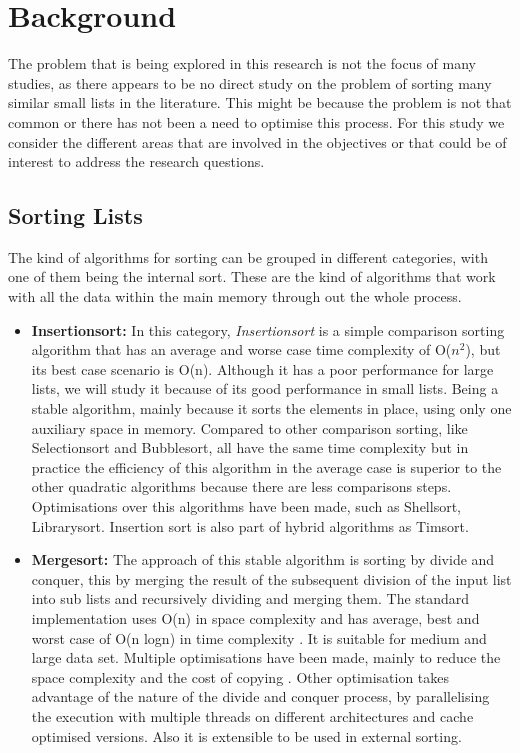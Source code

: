 \documentclass[a4paper,12pt]{article}
\begin{document}
\section{Background}

The problem that is being explored in this research is not the focus of many studies, as there appears to be no direct study on the problem of sorting many similar small lists in the literature. This might be because the problem is not that common or there has not been a need to optimise this process. For this study we consider the different areas that are involved in the objectives or that could be of interest to address the research questions.

\subsection {Sorting Lists}
The kind of algorithms for sorting can be grouped in different categories, with one of them being the internal sort. These are the kind of algorithms that work with all the data within the main memory through out the whole process.
\begin{itemize}
\item {\bf Insertionsort:}  In this category, {\it Insertionsort} is a simple comparison sorting algorithm that has an average and worse case time complexity of O(${n}^2$), but its best case scenario is O(n). Although it has a poor performance for large lists, we will study it because of its good performance in small lists. Being a stable algorithm, mainly because it sorts the elements in place, using only one auxiliary space in memory\cite{knuth1997artInsert}. Compared to other comparison sorting, like Selectionsort and Bubblesort, all have the same time complexity but in practice the efficiency of this algorithm in the average case is superior to the other quadratic algorithms because there are less comparisons steps. Optimisations over this algorithms have been made, such as Shellsort\cite{knuth1997artShell}, Librarysort\cite{bender2006insertion}. Insertion sort is also part of hybrid algorithms as Timsort\cite{Timsort}.

\item {\bf Mergesort:} The approach of this stable algorithm is sorting by divide and conquer, this by merging the result of the subsequent division of the input list into sub lists and recursively dividing and merging them. The standard implementation uses O(n) in space complexity and has average, best and worst case of O(n logn) in time complexity \cite{knuth1997artMerge}. It is suitable for medium and large data set. Multiple optimisations have been made, mainly to reduce the space complexity and the cost of copying \cite{Huang:1988:PIM:42392.42403}.  Other optimisation takes advantage of the nature of the divide and conquer process, by parallelising the execution with multiple threads \cite{chhugani2008efficient} on different architectures and cache optimised versions. Also it is extensible to be used in external sorting.
 \end{itemize}
\end{document}
